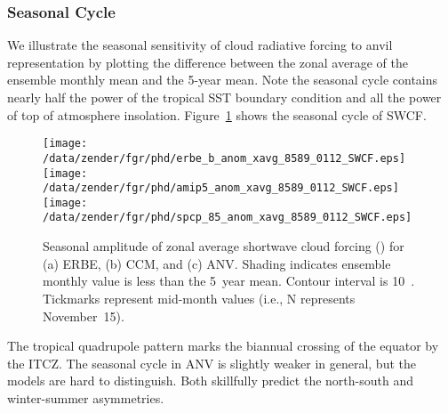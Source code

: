 \documentclass[agums]{aguplus}
\begin{document}
\subsubsection{Seasonal Cycle}\label{sec:sc}


We illustrate the seasonal sensitivity of cloud radiative forcing to
anvil representation by plotting the difference between the zonal
average of the ensemble monthly mean and the 5-year mean.
Note the seasonal cycle contains nearly half the power of the tropical
SST boundary condition and all the power of top of atmosphere
insolation.
Figure~\ref{fig:anom_xavg_8589_0112_SWCF} shows the seasonal cycle of
SWCF. 
\begin{figure}
\begin{center}
\setlength{\widthdim}{\halfwidth}\ifphdcsz{\setlength{\widthdim}{.9\widthdim}}{}
\texttt{[image: /data/zender/fgr/phd/erbe\_b\_anom\_xavg\_8589\_0112\_SWCF.eps]}\vfill
\texttt{[image: /data/zender/fgr/phd/amip5\_anom\_xavg\_8589\_0112\_SWCF.eps]}\vfill
\texttt{[image: /data/zender/fgr/phd/spcp\_85\_anom\_xavg\_8589\_0112\_SWCF.eps]}\vfill
\end{center}
\caption[Seasonal amplitude of zonal average shortwave cloud forcing
for ERBE, CCM, and ANV]{
Seasonal amplitude of zonal average shortwave cloud 
forcing (\wxmS) for (a) ERBE, (b) CCM, and (c) ANV. 
Shading indicates ensemble monthly value is less than the 5~year
mean. 
Contour interval is 10~\wxmS.
Tickmarks represent mid-month values (i.e., N represents
November~15). 
\label{fig:anom_xavg_8589_0112_SWCF}}   
\end{figure}
The tropical quadrupole pattern marks the biannual crossing of the
equator by the ITCZ. 
The seasonal cycle in ANV is slightly weaker in general, but the
models are hard to distinguish. 
Both skillfully predict the north-south and winter-summer
asymmetries. 
\end{document}
